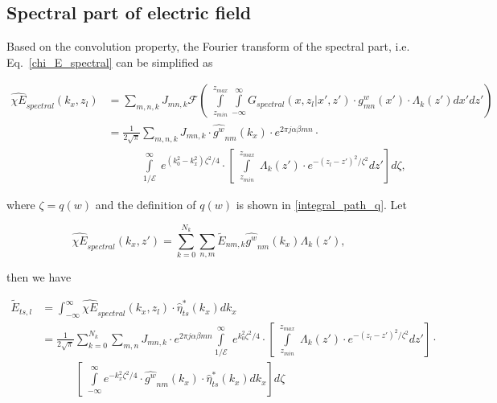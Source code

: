 \documentclass[preprint,12pt]{elsarticle}
\begin{document}
\subsection{Spectral part of electric field}
 Based on the convolution property, the Fourier transform of the spectral part, i.e. Eq.~\eqref{chi_E_spectral} can be simplified as
 \begin{small}
 \begin{equation}
 \begin{split}
 \widehat{\chi E}_{spectral}(k_{x},z_l) &=  \sum_{m,n,k}J_{mn,k} \mathcal{F} \left(  \; \int \limits^{z_{max}}_{z_{min}}\int \limits^{\infty}_{-\infty} G_{spectral}(x,z_l|x',z')\cdot {g^w_{mn}}(x') \cdot \Lambda_k (z')  dx' dz'  \right) \\
 &=\frac{1}{2\sqrt{\pi}} \sum_{m,n,k}J_{mn,k}\cdot {\widehat{g^w}_{nm}}(k_{x}) \cdot e^{2\pi j \alpha \beta mn} \cdot \\
 &\qquad \quad \int \limits^{\infty}_{1/\mathcal{E}}\;  e^{(k_0^2 - k_{x}^2)\zeta^2/4} \cdot  \left[ \; \int \limits^{z_{max}}_{z_{min}} \; \Lambda_k(z') \cdot e^{-(z_l - z')^2/\zeta^2} dz'\right] d\zeta,
 \end{split}
 \end{equation}
 \end{small}
 where $\zeta = q(w)$ and the definition of $q(w)$ is shown in \eqref{integral_path_q}.
Let
 \begin{small}
 \begin{equation}
  \widehat{\chi E}_{spectral}(k_{x},z') = \sum^{N_k}_{k=0} \sum_{n,m} \widetilde{E}_{nm,k}{\widehat{g^w}_{nm}}(k_{x})\Lambda_k(z'),
 \end{equation}
 \end{small}
 then we have
 \begin{small}
 \begin{equation}
 \begin{split}
 \widetilde{E}_{ts,l} &= \int^{\infty}_{-\infty} \widehat{\chi E}_{spectral}(k_{x},z_l) \cdot \widehat{\eta}^*_{ts}(k_{x}) dk_{x}\\
 &= \frac{1}{2\sqrt{\pi}}\sum^{N_k}_{k=0}\sum_{m,n}J_{mn,k}\cdot e^{2\pi j \alpha \beta mn} 
 \int \limits^{\infty}_{1/\mathcal{E}} \; e^{k_0^2 \zeta^2/4}\cdot \left[ \; \int \limits^{z_{max}}_{z_{min}}\; \Lambda_k(z') \cdot e^{-(z_l- z')^2/\zeta^2}dz' \right]
  \cdot  \\
&\qquad \quad \left[\;  \int \limits^{\infty}_{-\infty} e^{-k^2_{x}\zeta^2/4}\cdot {\widehat{g^w}_{nm}}(k_{x})\cdot \widehat{\eta}^*_{ts}(k_{x})dk_{x}\right]d\zeta 
\end{split}
\label{E_spectral_nml}
\end{equation}
\end{small}
\end{document}
